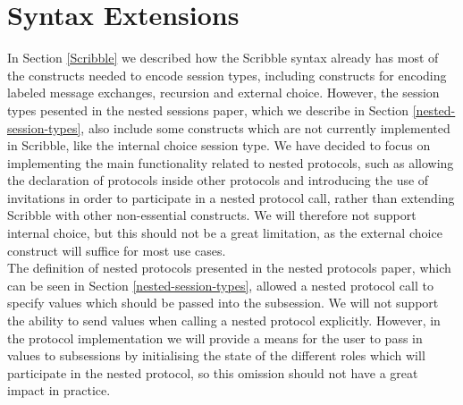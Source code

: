 \documentclass[12pt,twoside]{report}
\begin{document}
\section{Syntax Extensions}\label{scribble-extensions}


In Section \ref{Scribble} we described how the Scribble syntax already has most of the constructs needed to encode session types, including constructs for encoding labeled message exchanges, recursion and external choice. However, the session types pesented in the nested sessions paper\cite{nestedprotocols}, which we describe in Section \ref{nested-session-types}, also include some constructs which are not currently implemented in Scribble, like the internal choice session type. We have decided to focus on implementing the main functionality related to nested protocols, such as allowing the declaration of protocols inside other protocols and introducing the use of invitations in order to participate in a nested protocol call, rather than extending Scribble with other non-essential constructs. We will therefore not support internal choice, but this should not be a great limitation, as the external choice construct will suffice for most use cases.
\\

The definition of nested protocols presented in the nested protocols paper\cite{nestedprotocols}, which can be seen in Section \ref{nested-session-types}, allowed a nested protocol call to specify values which should be passed into the subsession. We will not support the ability to send values when calling a nested protocol explicitly. However, in the protocol implementation we will provide a means for the user to pass in values to subsessions by initialising the state of the different roles which will participate in the nested protocol, so this omission should not have a great impact in practice.\\
\end{document}
